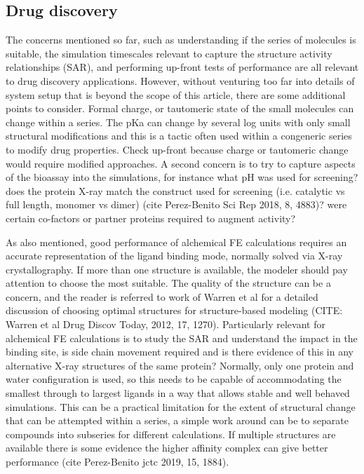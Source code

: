 \documentclass[9pt,bestpractices]{livecoms}
\begin{document}
\subsection*{Drug discovery}

The concerns mentioned so far, such as understanding if the series of molecules is suitable, the simulation timescales relevant to capture the structure activity relationships (SAR), and performing up-front tests of performance are all relevant to drug discovery applications. However, without venturing too far into details of system setup that is beyond the scope of this article, there are some additional points to consider. Formal charge, or tautomeric state of the small molecules can change within a series. The pKa can change by several log units with only small structural modifications and this is a tactic often used within a congeneric series to modify drug properties. Check up-front because charge or tautomeric change would require modified approaches. A second concern is to try to capture aspects of the bioassay into the simulations, for instance what pH was used for screening? does the protein X-ray match the construct used for screening (i.e. catalytic vs full length, monomer vs dimer) (cite Perez-Benito Sci Rep 2018, 8, 4883)? were certain co-factors or partner proteins required to augment activity? 
%

As also mentioned, good performance of alchemical FE calculations requires an accurate representation of the ligand binding mode, normally solved via X-ray crystallography. If more than one structure is available, the modeler should pay attention to choose the most suitable. The quality of the structure can be a concern, and the reader is referred to work of Warren et al for a detailed discussion of choosing optimal structures for structure-based modeling (CITE: Warren et al Drug Discov Today, 2012, 17, 1270). Particularly relevant for alchemical FE calculations is to study the SAR and understand the impact in the binding site, is side chain movement required and is there evidence of this in any alternative X-ray structures of the same protein? Normally, only one protein and water configuration is used, so this needs to be capable of accommodating the smallest through to largest ligands in a way that allows stable and well behaved simulations. This can be a practical limitation for the extent of structural change that can be attempted within a series, a simple work around can be to separate compounds into subseries for different calculations. If multiple structures are available there is some evidence the higher affinity complex can give better performance (cite Perez-Benito jctc 2019, 15, 1884). 
%
\end{document}
